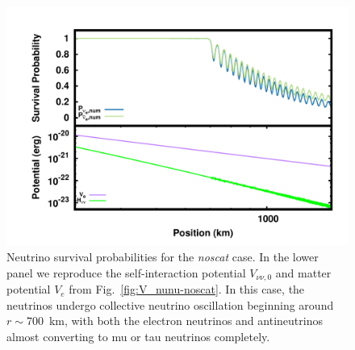 \documentclass[aps,floatfix,prd,superscriptaddress,twocolumn]{revtex4-1}
\begin{document}
\begin{figure}
  \includegraphics[width=\columnwidth]{fig-survival_prob-noscat_ih}
  \caption{Neutrino survival probabilities for the \emph{noscat} case.
    In the lower panel we reproduce the self-interaction potential $V_{\nu\nu,0}$
    and matter potential $V_e$ from Fig.~\ref{fig:V_nunu-noscat}.
    In this case, the neutrinos undergo collective neutrino oscillation
    beginning around $r\sim700$~km,
    with both the electron neutrinos and antineutrinos almost converting to mu
    or tau neutrinos completely.
  }
  \label{fig:survival-noscat}
\end{figure}
\end{document}
